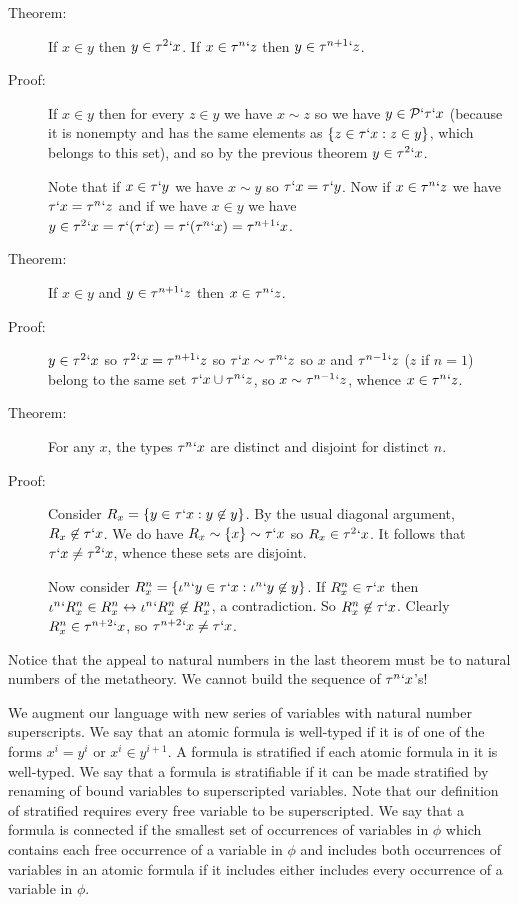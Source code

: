\documentclass[12pt]{article}
\begin{document}
\begin{description}
\item[Theorem:]  If $x \in y$ then $y \in \tau^2`x$.  If $x \in \tau^n`z$ then $y \in \tau^{n+1}`z$.

\item[Proof:]   If $x \in y$ then for every $z \in y$ we have $x \sim z$ so we have $y \in {\cal P}`\tau`x$ (because it is nonempty and has the same elements
as $\{z \in \tau`x:z \in y\}$, which belongs to this set), and so by the previous theorem $y \in \tau^2`x$.

Note that if $x \in \tau`y$ we have $x \sim y$ so $\tau`x = \tau`y$.  Now if $x \in \tau^n`z$ we have $\tau`x = \tau^n`z$ and if we have $x \in y$ we have $y \in \tau^2`x = \tau`(\tau`x) = \tau`(\tau^n`x) = \tau^{n+1}`x$.

\item[Theorem:]  If $x \in y$ and $y \in \tau^{n+1}`z$ then $x \in \tau^n`z$.

\item[Proof:]   $y \in \tau^2`x$ so $\tau^2`x = \tau^{n+1}`z$  so $\tau`x \sim \tau^n`z$ so $x$ and $\tau^{n-1}`z$ ($z$ if $n=1$) belong to the same set
$\tau`x \cup \tau^n`z$, so $x \sim \tau^{n-1}`z$, whence $x \in \tau^n`z$.

\item[Theorem:]  For any $x$, the types $\tau^n`x$ are distinct and disjoint for distinct $n$.

\item[Proof:]  Consider $R_x = \{y \in \tau`x:y \not\in y\}$.  By the usual diagonal argument, $R_x \not\in \tau`x$.  We do have $R_x \sim \{x\} \sim \tau`x$ so $R_x \in \tau^2`x$.  It follows
that $\tau`x \neq \tau^2`x$, whence these sets are disjoint.

Now consider $R^n_x = \{\iota^{n}`y \in \tau`x:\iota^{n}`y \not\in y\}$.  If $R^n_x \in \tau`x$ then $\iota^n`R^n_x \in R^n_x \leftrightarrow \iota^n`R^n_x \not\in R^n_x$, a contradiction.  So $R^n_x \not\in \tau`x$.  Clearly $R^n_x \in \tau^{n+2}`x$, so $\tau^{n+2}`x \neq \tau`x$.



\end{description}

Notice that the appeal to natural numbers in the last theorem must be to natural numbers of the metatheory.  We cannot build the sequence of $\tau^n`x$'s!

We augment our language with new series of variables with natural number superscripts.  We say that an atomic formula is well-typed if it is of one of the forms
$x^i=y^i$ or $x^i \in y^{i+1}$.  A formula is stratified if each atomic formula in it is well-typed.  We say that a formula is stratifiable if it can be made stratified by
renaming of bound variables to superscripted variables.  Note that our definition of stratified requires every free variable to be superscripted.  We say that a formula is connected if the smallest set of occurrences of variables in $\phi$ which contains each free occurrence of a variable in $\phi$ and includes both occurrences of variables in an atomic formula if it includes either includes every occurrence of a variable in $\phi$.
\end{document}
